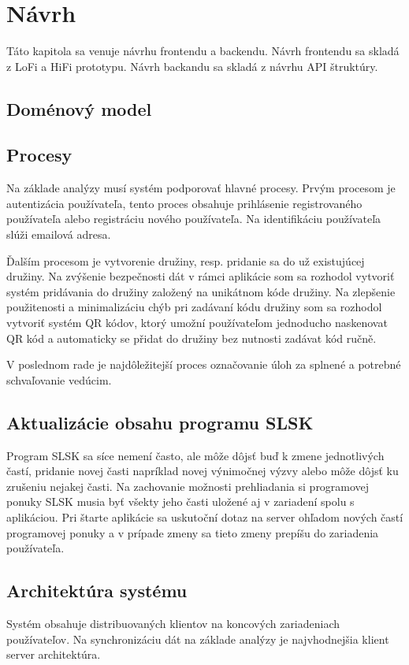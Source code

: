 \chapter{Návrh}
Táto kapitola sa venuje návrhu frontendu a backendu. Návrh frontendu sa skladá z LoFi a HiFi prototypu. Návrh backandu sa skladá z návrhu API štruktúry.

\section{Doménový model}


\section{Procesy}
Na základe analýzy musí systém podporovať hlavné procesy. Prvým procesom je autentizácia používateľa, tento proces obsahuje prihlásenie registrovaného používateľa alebo registráciu nového používateľa. Na identifikáciu používateľa slúži emailová adresa. 

Ďalším procesom je vytvorenie družiny, resp. pridanie sa do už existujúcej družiny. Na zvýšenie bezpečnosti dát v rámci aplikácie som sa rozhodol vytvoriť systém pridávania do družiny založený na unikátnom kóde družiny. Na zlepšenie použitenosti a minimalizáciu chýb pri zadávaní kódu družiny som sa rozhodol vytvoriť systém QR kódov, ktorý umožní používateľom jednoducho naskenovat QR kód a automaticky se přidat do družiny bez nutnosti zadávat kód ručně.

V poslednom rade je najdôležitejší proces označovanie úloh za splnené a potrebné schvaľovanie vedúcim.

\section{Aktualizácie obsahu programu SLSK}
Program SLSK sa síce nemení často, ale môže dôjsť buď k zmene jednotlivých častí, pridanie novej časti napríklad novej výnimočnej výzvy alebo môže dôjsť ku zrušeniu nejakej časti. Na zachovanie možnosti prehliadania si programovej ponuky SLSK musia byť všekty jeho časti uložené aj v zariadení spolu s aplikáciou. Pri štarte aplikácie sa uskutoční dotaz na server ohľadom nových častí programovej ponuky a v prípade zmeny sa tieto zmeny prepíšu do zariadenia používateľa.


\section{Architektúra systému}
Systém obsahuje distribuovaných klientov na koncových zariadeniach používateľov. Na synchronizáciu dát na základe analýzy je najvhodnejšia klient server architektúra.

